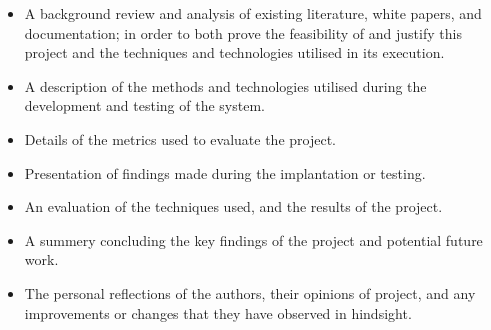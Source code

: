 \begin{itemize}

\item A background review and analysis of existing literature, white papers, and
documentation; in order to both prove the feasibility of and justify this
project and the techniques and technologies utilised in its execution.

\item A description of the methods and technologies utilised during the development
and testing of the system.

\item Details of the metrics used to evaluate the project.

\item Presentation of findings made during the implantation or testing.

\item An evaluation of the techniques used, and the results of the project.

\item A summery concluding the key findings of the project and potential future
work.

\item The personal reflections of the authors, their opinions of project, and any
improvements or changes that they have observed in hindsight.

\end{itemize}
